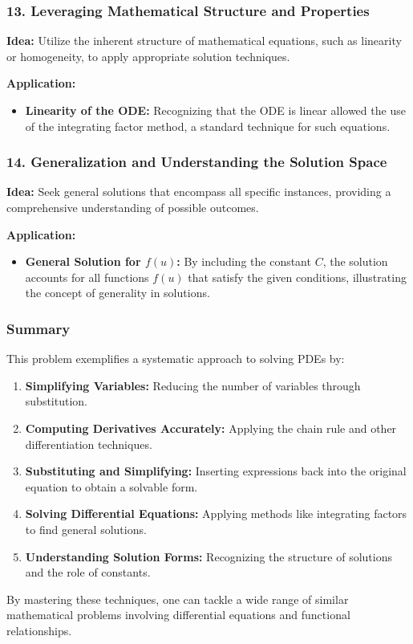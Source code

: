 \documentclass[a4paper,12pt]{book}
\begin{document}
\subsubsection{13. Leveraging Mathematical Structure and Properties}

\textbf{Idea:} Utilize the inherent structure of mathematical equations, such as linearity or homogeneity, to apply appropriate solution techniques.

\textbf{Application:}
\begin{itemize}
\item 
\textbf{Linearity of the ODE:} Recognizing that the ODE is linear allowed the use of the integrating factor method, a standard technique for such equations.

\end{itemize}

\subsubsection{14. Generalization and Understanding the Solution Space}

\textbf{Idea:} Seek general solutions that encompass all specific instances, providing a comprehensive understanding of possible outcomes.

\textbf{Application:}
\begin{itemize}
\item 
\textbf{General Solution for \( f(u) \):} By including the constant \( C \), the solution accounts for all functions \( f(u) \) that satisfy the given conditions, illustrating the concept of generality in solutions.

\end{itemize}

\subsubsection{Summary}

This problem exemplifies a systematic approach to solving PDEs by:
\begin{enumerate}
\item 
\textbf{Simplifying Variables:} Reducing the number of variables through substitution.

\item 
\textbf{Computing Derivatives Accurately:} Applying the chain rule and other differentiation techniques.

\item 
\textbf{Substituting and Simplifying:} Inserting expressions back into the original equation to obtain a solvable form.

\item 
\textbf{Solving Differential Equations:} Applying methods like integrating factors to find general solutions.

\item 
\textbf{Understanding Solution Forms:} Recognizing the structure of solutions and the role of constants.

\end{enumerate}

By mastering these techniques, one can tackle a wide range of similar mathematical problems involving differential equations and functional relationships.
\end{document}
